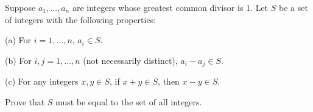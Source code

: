 Suppose $a_1, \dots, a_n$ are integers whose greatest common divisor is 1. Let $S$ be a set of integers with the following properties:

(a) For $i=1, \dots, n$,  $a_i \in S$.

(b) For $i,j = 1, \dots, n$ (not necessarily distinct), $a_i - a_j \in S$.

(c) For any integers $x,y \in S$,  if $x+y \in S$,  then $x-y \in S$.

Prove that $S$ must be equal to the set of all integers.